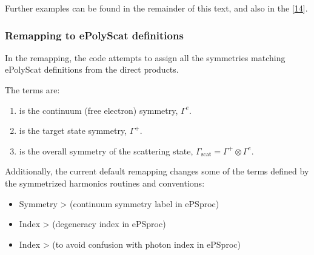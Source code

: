 \documentclass[letterpaper,table,10pt,english]{jupyterBook}
\begin{document}
\sphinxAtStartPar
Further examples can be found in the remainder of this text, and also in the  {[}\hyperlink{cite.backmatter/bibliography:id667}{14}{]}.


\subsubsection{Remapping to ePolyScat definitions}
\label{\detokenize{part2/sym-fitting-intro_220423:remapping-to-epolyscat-definitions}}\label{\detokenize{part2/sym-fitting-intro_220423:sec-basis-sets-remapping-to-eps}}
\sphinxAtStartPar
In the remapping, the code attempts to assign all the symmetries matching ePolyScat definitions from the direct products.

\sphinxAtStartPar
The terms are:
\begin{enumerate}
%
\item {} 
\sphinxAtStartPar
{} is the continuum (free electron) symmetry, \(\Gamma^{e}\).

\item {} 
\sphinxAtStartPar
{} is the target state symmetry, \(\Gamma^{+}\).

\item {} 
\sphinxAtStartPar
{} is the overall symmetry of the scattering state, \(\Gamma_{\mathrm{scat}}=\Gamma^{+}\otimes\Gamma^{e}\).

\end{enumerate}

\sphinxAtStartPar
Additionally, the current default remapping changes some of the terms defined by the symmetrized harmonics routines and conventions:
\begin{itemize}
\item {} 
\sphinxAtStartPar
Symmetry  >  (continuum symmetry label in ePSproc)

\item {} 
\sphinxAtStartPar
Index  >  (degeneracy index in ePSproc)

\item {} 
\sphinxAtStartPar
Index  >  (to avoid confusion with photon index  in ePSproc)

\end{itemize}
\end{document}
